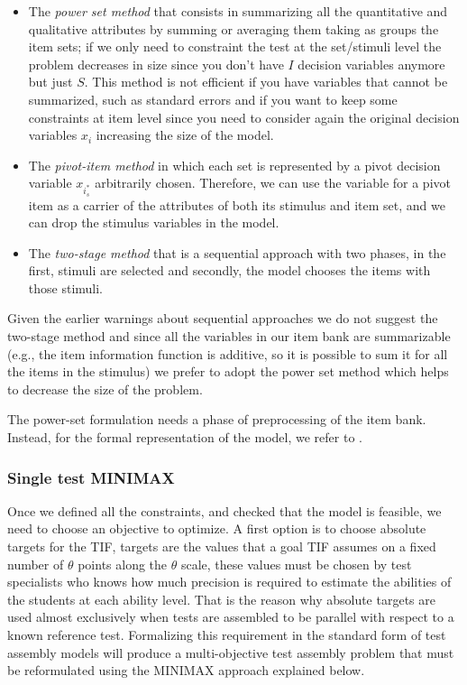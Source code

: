\begin{itemize}
	\item The \textit{power set method} that consists in summarizing all the quantitative and qualitative attributes by summing or averaging them taking as groups the item sets; if we only need to constraint the test at the set/stimuli level the problem decreases in size since you don't have $I$ decision variables anymore but just $S$. This method is not efficient if you have variables that cannot be summarized, such as standard errors and if you want to keep some constraints at item level since you need to consider again the original decision variables $x_i$ increasing the size of the model.
	\item The \textit{pivot-item method} in which each set is represented by a pivot decision variable $x_{i^*_s}$ arbitrarily chosen. Therefore, we can use the variable for a pivot item as a carrier of the attributes of both its stimulus and item set, and we can drop the stimulus variables in the model.
	\item The \textit{two-stage method} that is a sequential approach with two phases, in the first, stimuli are selected and secondly, the model chooses the items with those stimuli.
	
\end{itemize}
Given the earlier warnings about sequential approaches we do not suggest the two-stage method and since all the variables in our item bank are summarizable (e.g., the item information function is additive, so it is possible to sum it for all the items in the stimulus) we prefer to adopt the power set method which helps to decrease the size of the problem.
\par{
	The power-set formulation needs a phase of preprocessing of the item bank.
	Instead, for the formal representation of the model, we refer to \textcite[Section 7.2, ][]{VDL2005}.}

\subsubsection{Single test MINIMAX}\label{sec:single-test-minimax}

Once we defined all the constraints, and checked that the model is feasible, we need to choose an objective to optimize.
A first option is to choose absolute targets for the TIF, targets are the values that a goal TIF assumes on a fixed number of $\theta$ points along the $\theta$ scale, these values must be chosen by test specialists who knows how much precision is required to estimate the abilities of the students at each ability level.
That is the reason why absolute targets are used almost exclusively when tests are assembled to be parallel with respect to a known reference test. 
Formalizing this requirement in the standard form of test assembly models will produce a multi-objective test assembly problem that must be reformulated using the MINIMAX approach explained below.

